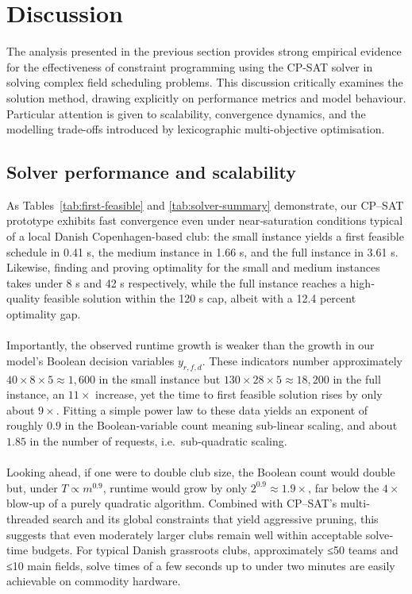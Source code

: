 \documentclass[12pt]{article}
\begin{document}
\section{Discussion}

The analysis presented in the previous section provides strong empirical evidence for the effectiveness of constraint programming using the CP-SAT solver in solving complex field scheduling problems. This discussion critically examines the solution method, drawing explicitly on performance metrics and model behaviour. Particular attention is given to scalability, convergence dynamics, and the modelling trade-offs introduced by lexicographic multi-objective optimisation.

\vspace{0.5em}
\vspace{0.5em}
\subsection{Solver performance and scalability}

As Tables~\ref{tab:first‐feasible} and \ref{tab:solver-summary} demonstrate, our CP–SAT prototype exhibits fast convergence even under near‐saturation conditions typical of a local Danish Copenhagen-based club: the small instance yields a first feasible schedule in 0.41 s, the medium instance in 1.66 s, and the full instance in 3.61 s. Likewise, finding and proving optimality for the small and medium instances takes under 8 s and 42 s respectively, while the full instance reaches a high‐quality feasible solution within the 120 s cap, albeit with a 12.4 percent optimality gap.
\\
\\
Importantly, the observed runtime growth is weaker than the growth in our model’s Boolean decision variables \(y_{r,f,d}\).  These indicators number approximately \(40\times8\times5\approx1{,}600\) in the small instance but \(130\times28\times5\approx18{,}200\) in the full instance, an \(11\times\) increase,  yet the time to first feasible solution rises by only about \(9\times\).  Fitting a simple power law to these data yields an exponent of roughly \(0.9\) in the Boolean‐variable count meaning sub‐linear scaling, and about \(1.85\) in the number of requests, i.e.\ sub‐quadratic scaling.
\\
\\
Looking ahead, if one were to double club size, the Boolean count would double but, under \(T\propto m^{0.9}\), runtime would grow by only \(2^{0.9}\approx1.9\times\), far below the \(4\times\) blow‐up of a purely quadratic algorithm.  Combined with CP–SAT’s multi‐threaded search and its global constraints that yield aggressive pruning, this suggests that even moderately larger clubs remain well within acceptable solve‐time budgets. For typical Danish grassroots clubs, approximately ≤50 teams and ≤10 main fields, solve times of a few seconds up to under two minutes are easily achievable on commodity hardware. 
\vspace{0.5em}
\end{document}
